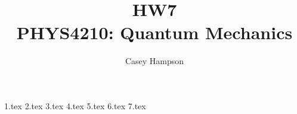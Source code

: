 \documentclass{article}
\title{HW7 \\[5pt] PHYS4210: Quantum Mechanics}
\author{Casey Hampson}
\begin{document}
    \maketitle

    {1.tex}
    {2.tex}
    {3.tex}
    {4.tex}
    {5.tex}
    {6.tex}
    {7.tex}    
\end{document}
